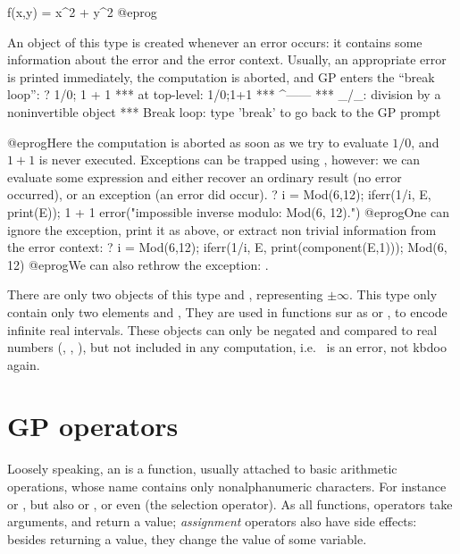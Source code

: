   f(x,y) = x^2 + y^2
@eprog

%
An object of this type is created whenever an error occurs: it contains some
information about the error and the error context. Usually, an appropriate
error is printed immediately, the computation is aborted, and GP enters the
``break loop'':
\bprog
  ? 1/0; 1 + 1
    ***   at top-level: 1/0;1+1
    ***                  ^------
    *** _/_: division by a noninvertible object
    ***   Break loop: type 'break' to go back to the GP prompt

@eprog\noindent Here the computation is aborted as soon as we try to evaluate
$1/0$, and $1 + 1$ is never executed. Exceptions can be trapped
using , however: we can evaluate some expression and either recover
an ordinary result (no error occurred), or an exception (an error did occur).
\bprog
  ? i = Mod(6,12); iferr(1/i, E, print(E)); 1 + 1
  error("impossible inverse modulo: Mod(6, 12).")
@eprog\noindent One can ignore the exception, print it as above, or extract
non trivial information from the error context:
\bprog
  ? i = Mod(6,12); iferr(1/i, E, print(component(E,1)));
  Mod(6, 12)
@eprog\noindent We can also rethrow the exception: .

%

There are only two objects of this type  and , representing
$\pm\infty$. This type only contain only two elements  and ,
They are used in functions sur as  or , to
encode infinite real intervals. These objects can only be negated and
compared to real numbers (, , ), but not
included in any computation, i.e.~ is an error, not kbd{oo} again.

\section{GP operators}\label{se:operators}

\noindent Loosely speaking, an  is a function, usually
attached to basic arithmetic operations, whose name contains only
nonalphanumeric characters. For instance \kbd{+} or \kbd{-}, but also
\kbd{=} or \kbd{+=}, or even \kbd{[ ]} (the selection operator). As all
functions, operators take arguments, and return a value; \emph{assignment}
operators also have side effects: besides returning a value, they change the
value of some variable.


